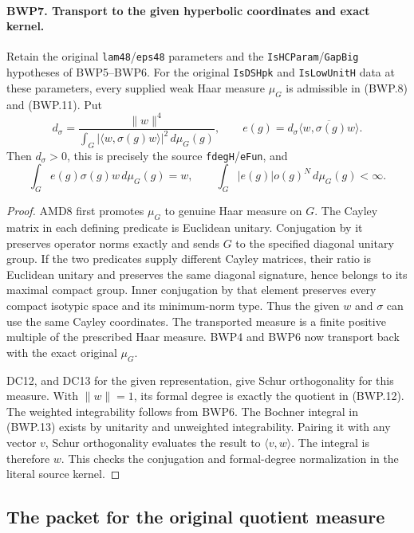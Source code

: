 \documentclass[11pt,a4paper]{article}
\numberwithin{equation}{section}
\theoremstyle{remark}\newtheorem{remark}[theorem]{Remark}
\begin{document}
\paragraph{BWP7. Transport to the given hyperbolic coordinates and exact kernel.}
\label{claim:BWP7}
Retain the original \texttt{lam48}/\texttt{eps48} parameters and
the \texttt{Is\allowbreak HCParam}/\texttt{Gap\allowbreak Big} hypotheses of BWP5--BWP6.
For the original \texttt{Is\allowbreak DSHpk} and \texttt{Is\allowbreak Low\allowbreak Unit\allowbreak H} data
at these parameters,
every supplied weak Haar measure \(\mu_G\) is admissible in
(BWP.8) and (BWP.11).  Put
\[
 d_\sigma=\frac{\|w\|^4}
 {\int_G|\langle w,\sigma(g)w\rangle|^2\,d\mu_G(g)},
 \qquad e(g)=d_\sigma\overline{\langle w,\sigma(g)w\rangle}.
 \tag{BWP.12}
\]
Then \(d_\sigma>0\), this is precisely the source
\texttt{fdeg\allowbreak H}/\texttt{e\allowbreak Fun}, and
\[
 \int_G e(g)\sigma(g)w\,d\mu_G(g)=w,
 \qquad \int_G|e(g)|o(g)^N\,d\mu_G(g)<\infty.
 \tag{BWP.13}
\]

\begin{proof}
AMD8 first promotes \(\mu_G\) to genuine Haar measure on \(G\).
The Cayley matrix in each defining predicate is Euclidean unitary.
Conjugation by it preserves operator norms exactly and sends \(G\)
to the specified diagonal unitary group.  If the two predicates supply
different Cayley matrices, their ratio is Euclidean unitary and
preserves the same diagonal signature, hence belongs to its maximal
compact group.  Inner conjugation by that element preserves every
compact isotypic space and its minimum-norm type.  Thus the given
\(w\) and \(\sigma\) can use the same Cayley coordinates.
The transported measure is a finite positive multiple of the prescribed
Haar measure.  BWP4 and BWP6 now transport back with the exact original
\(\mu_G\).

DC12, and DC13 for the given representation, give Schur orthogonality
for this measure.  With \(\|w\|=1\), its formal degree is exactly
the quotient in (BWP.12).  The weighted integrability follows from
BWP6.  The Bochner integral in (BWP.13) exists by unitarity and
unweighted integrability.  Pairing it with any vector \(v\), Schur
orthogonality evaluates the result to \(\langle v,w\rangle\).
The integral is therefore \(w\).  This checks the conjugation and
formal-degree normalization in the literal source kernel.
\end{proof}

\subsection{The packet for the original quotient measure}
\end{document}
